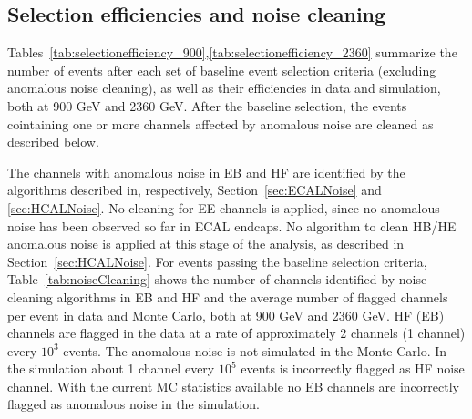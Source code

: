 \subsection{Selection efficiencies and noise cleaning}

Tables~\ref{tab:selectionefficiency_900},\ref{tab:selectionefficiency_2360}
summarize the number of events after each set of baseline event selection
criteria (excluding anomalous noise cleaning), 
as well as their efficiencies in data and simulation, both at 900 GeV and 2360 GeV. 
After the baseline selection, the events cointaining one or more channels 
affected by anomalous noise are cleaned as described below.
 
The channels with anomalous noise in EB and HF are identified by the algorithms 
described in, respectively, Section~\ref{sec:ECALNoise} and \ref{sec:HCALNoise}.
No cleaning for EE channels is applied, since no anomalous noise has been observed 
so far in ECAL endcaps. No algorithm to clean HB/HE anomalous noise is applied 
at this stage of the analysis, as described in Section~\ref{sec:HCALNoise}.
For events passing the baseline selection criteria, Table~\ref{tab:noiseCleaning} shows the number of
channels identified by noise cleaning algorithms in EB and HF and the average number of flagged channels 
per event in data and Monte Carlo, both at 900 GeV and 2360 GeV.
HF (EB) channels are flagged in the data at a rate of approximately 2 channels (1 channel) 
every $10^3$ events. The anomalous noise is not simulated in the Monte Carlo. In the simulation 
about 1 channel every $10^5$ events is incorrectly flagged as HF noise channel.
With the current MC statistics available no EB channels are incorrectly flagged 
as anomalous noise in the simulation.

